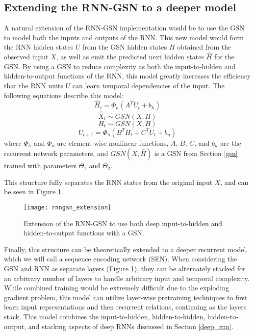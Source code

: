 \subsection{Extending the RNN-GSN to a deeper model}
A natural extension of the RNN-GSN implementation would be to use the GSN to model both the inputs and outputs of the RNN. This new model would form the RNN hidden states $U$ from the GSN hidden states $H$ obtained from the observed input $X$, as well as emit the predicted next hidden states $\hat{H}$ for the GSN. By using a GSN to reduce complexity as both the input-to-hidden and hidden-to-output functions of the RNN, this model greatly increases the efficiency that the RNN units $U$ can learn temporal dependencies of the input. The following equations describe this model:
\begin{equation}
	\hat{H}_t = \Phi_{h}(A^TU_{t} + b_h)
\end{equation}
\begin{equation}
	\hat{X}_t \sim GSN(X,H)
\end{equation}
\begin{equation}
	H_t \sim GSN(X,H)
\end{equation}
\begin{equation}
	U_{t+1} = \Phi_{u}(B^TH_t + C^TU_t + b_u)
\end{equation}
where \(\Phi_h\) and \(\Phi_u\) are element-wise nonlinear functions,  $A$, $B$, $C$, and $b_u$ are the recurrent network parameters, and $GSN(X,\hat{H})$ is a GSN from Section \ref{gsn} trained with parameters $\Theta_1$ and $\Theta_2$.

This structure fully separates the RNN states from the original input $X$, and can be seen in Figure \ref{fig:rnngsn2}.

\begin{figure}[h!]
  \centering
    \texttt{[image: rnngsn\_extension]}
\caption{Extension of the RNN-GSN to use both deep input-to-hidden and hidden-to-output functions with a GSN.}\label{fig:rnngsn2}
\end{figure}

Finally, this structure can be theoretically extended to a deeper recurrent model, which we will call a sequence encoding network (SEN). When considering the GSN and RNN as separate layers (Figure \ref{fig:rnngsn2}), they can be alternately stacked for an arbitrary number of layers to handle arbitrary input and temporal complexity. While combined training would be extremely difficult due to the exploding gradient problem, this model can utilize layer-wise pretraining techniques to first learn input representations and then recurrent relations, continuing as the layers stack. This model combines the input-to-hidden, hidden-to-hidden, hidden-to-output, and stacking aspects of deep RNNs discussed in Section \ref{deep_rnn}.

